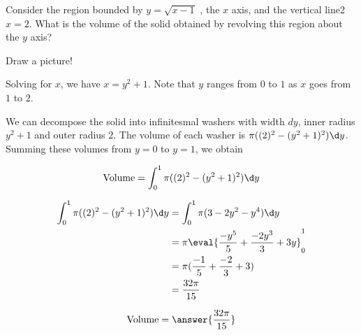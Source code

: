 \documentclass{ximera}
\author{Steven Gubkin}
\begin{document}
\begin{exercise}



Consider the region bounded by $y =\sqrt{x-1}$ , the $x$ axis, and the vertical line2 $x=2$.  What is the volume of the solid obtained by revolving this region about the $y$ axis?


\begin{hint}
	Draw a picture!
\end{hint}

\begin{hint}
	Solving for $x$, we have $x = y^2+1$.  Note that $y$ ranges from $0$ to $1$ as $x$ goes from $1$ to $2$.
\end{hint}

\begin{hint}
	We can decompose the solid into infinitesmal washers with width $dy$, inner radius $y^2+1$ and outer radius $2$.  The volume of each washer is $\pi((2)^2 - (y^2+1)^2)\d y$.  Summing these volumes from $y=0$ to $y=1$, we obtain

	\[
	\textrm{Volume} = \int_0^1 \pi((2)^2 - (y^2+1)^2)\d y
	\]
\end{hint}

\begin{hint}
	\begin{align*}
		 \int_0^1\pi((2)^2 - (y^2+1)^2)\d y &=  \int_0^1 \pi(3-2y^2-y^4)\d y\\
			&= \pi \eval{\frac{-y^5}{5}+\frac{-2y^3}{3}+3y}_0^1\\
			&=\pi(\frac{-1}{5}+\frac{-2}{3}+3)\\
			&=\frac{32\pi}{15}\\
	\end{align*}
\end{hint}

\begin{prompt}
	\[
		\textrm{Volume} = \answer{\frac{32\pi}{15}}
	\]
\end{prompt}

\end{exercise}
\end{document}
